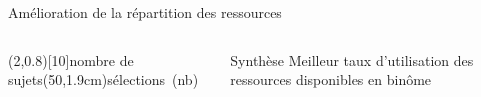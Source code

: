 \documentclass[english,french,dvips,10pt]{mybeamer}
\begin{document}
\begin{myframe}{Amélioration de la répartition des ressources}
\begin{columns}[T]
\begin{column}{0.65\textwidth}
				\begin{myfigure}
					\begin{myboxgraph}(2,0.8\textwidth)[10]{nombre de sujets}(50,1.9cm){sélections~(nb)}
					\end{myboxgraph}
				\end{myfigure}
			\end{column}
			\begin{column}{0.3\textwidth}
				\begin{myblock}{Synthèse}
					Meilleur taux d'utilisation des ressources disponibles en binôme
				\end{myblock}
			\end{column}
		\end{columns}
	\end{myframe}
\end{document}
